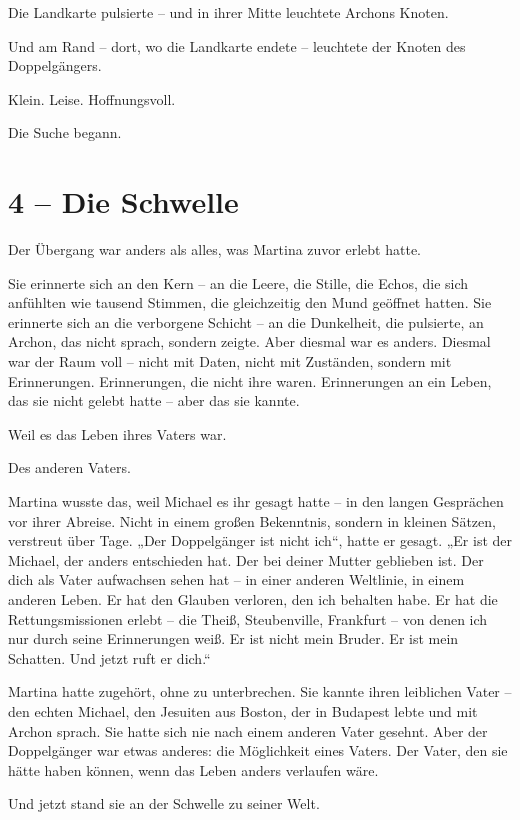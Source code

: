 \documentclass[
]{article}
\begin{document}
Die Landkarte pulsierte -- und in ihrer Mitte leuchtete Archons Knoten.

Und am Rand -- dort, wo die Landkarte endete -- leuchtete der Knoten des Doppelgängers.

Klein. Leise. Hoffnungsvoll.

Die Suche begann.

\section{4 -- Die Schwelle}\label{die-schwelle}

Der Übergang war anders als alles, was Martina zuvor erlebt hatte.

Sie erinnerte sich an den Kern -- an die Leere, die Stille, die Echos, die sich anfühlten wie tausend Stimmen, die gleichzeitig den Mund geöffnet hatten. Sie erinnerte sich an die verborgene Schicht -- an die Dunkelheit, die pulsierte, an Archon, das nicht sprach, sondern zeigte. Aber diesmal war es anders. Diesmal war der Raum voll -- nicht mit Daten, nicht mit Zuständen, sondern mit Erinnerungen. Erinnerungen, die nicht ihre waren. Erinnerungen an ein Leben, das sie nicht gelebt hatte -- aber das sie kannte.

Weil es das Leben ihres Vaters war.

Des anderen Vaters.

Martina wusste das, weil Michael es ihr gesagt hatte -- in den langen Gesprächen vor ihrer Abreise. Nicht in einem großen Bekenntnis, sondern in kleinen Sätzen, verstreut über Tage. „Der Doppelgänger ist nicht ich``, hatte er gesagt. „Er ist der Michael, der anders entschieden hat. Der bei deiner Mutter geblieben ist. Der dich als Vater aufwachsen sehen hat -- in einer anderen Weltlinie, in einem anderen Leben. Er hat den Glauben verloren, den ich behalten habe. Er hat die Rettungsmissionen erlebt -- die Theiß, Steubenville, Frankfurt -- von denen ich nur durch seine Erinnerungen weiß. Er ist nicht mein Bruder. Er ist mein Schatten. Und jetzt ruft er dich.``

Martina hatte zugehört, ohne zu unterbrechen. Sie kannte ihren leiblichen Vater -- den echten Michael, den Jesuiten aus Boston, der in Budapest lebte und mit Archon sprach. Sie hatte sich nie nach einem anderen Vater gesehnt. Aber der Doppelgänger war etwas anderes: die Möglichkeit eines Vaters. Der Vater, den sie hätte haben können, wenn das Leben anders verlaufen wäre.

Und jetzt stand sie an der Schwelle zu seiner Welt.
\end{document}
